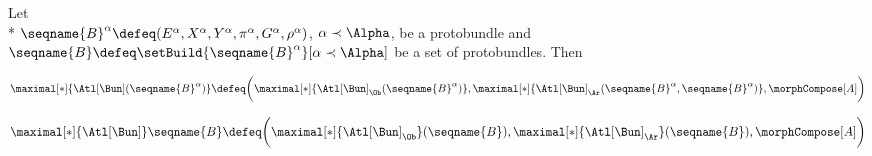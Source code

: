 \documentclass{article}
\begin{document}
\begin{definition}
\label{def:Bun-Atlcat}
Let \\*
$
  \seqname{B}^\alpha \defeq
  (E^\alpha, X^\alpha, Y^\alpha, \pi^\alpha, G^\alpha, \rho^\alpha)
$,
$\alpha \prec \Alpha$, be a protobundle and
$\seqname{B} \defeq \setBuild{{\seqname{B}^\alpha}}[\alpha \prec \Alpha]$
be a set of protobundles. Then

\begin{equation}
\maximal[*]
  {
    \Atl[\Bun]
      (
        \seqname{B}^\alpha
      )
  }
\defeq
  \biggl (
    \maximal[*]
      {
        \Atl[\Bun]_\Ob
          (
            \seqname{B}^\alpha
          )
      },
    \maximal[*]
      {
      \Atl[\Bun]_\Ar
        (
          \seqname{B}^\alpha,
          \seqname{B}^\alpha
        )
      },
    \morphCompose[A]
  \biggr )
\end{equation}

\begin{equation}
\maximal[*]{\Atl[\Bun]} \seqname{B}
\defeq
  \biggl (
    \maximal[*]{\Atl[\Bun]_\Ob}
      (
        \seqname{B}
      ),
    \maximal[*]{\Atl[\Bun]_\Ar}
      (
        \seqname{B}
      ),
    \morphCompose[A]
  \biggr )
\end{equation}
\end{definition}
\end{document}
